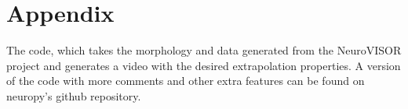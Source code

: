 
\section{Appendix}

The code\cite{neuropy}, which takes the morphology and data generated from the NeuroVISOR\cite{neuroVISOR} project and generates a video with the desired extrapolation properties.
A version of the code with more comments and other extra features can be found on neuropy's github repository.

\inputminted{python}{./code/extrapolateFromData.py}


